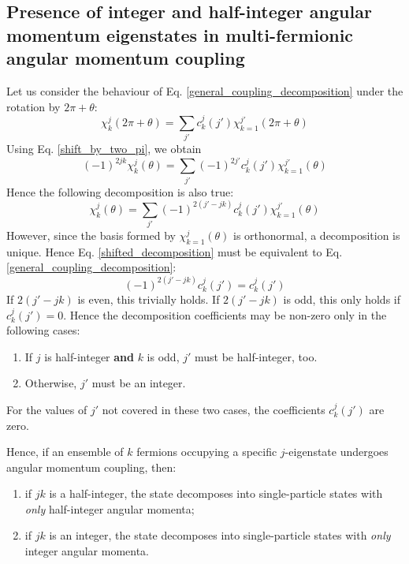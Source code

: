 \documentclass[12pt]{article}
\begin{document}
	\subsection{Presence of integer and half-integer angular momentum eigenstates in multi-fermionic angular momentum coupling} \label{presence_of_half_integer}
	Let us consider the behaviour of Eq. \ref{general_coupling_decomposition} under the rotation by $2\pi+\theta$:
	\begin{equation} 
	\chi^j_k(2\pi+\theta)=\sum_{j'}c^j_k(j')\chi^{j'}_{k=1}(2\pi+\theta)
	\end{equation}
	Using Eq. \ref{shift_by_two_pi}, we obtain
	\begin{equation} 
	(-1)^{2jk}\chi^j_k(\theta)=\sum_{j'}(-1)^{2j'}c^j_k(j')\chi^{j'}_{k=1}(\theta)
	\end{equation}
	Hence the following decomposition is also true:
	\begin{equation}  \label{shifted_decomposition}
	\chi^j_k(\theta)=\sum_{j'}(-1)^{2(j'-jk)}c^j_k(j')\chi^{j'}_{k=1}(\theta)
	\end{equation}
	However, since the basis formed by $\chi^j_{k=1}(\theta)$ is orthonormal, a decomposition is unique. Hence Eq. \ref{shifted_decomposition} must be equivalent to Eq. \ref{general_coupling_decomposition}:
	\begin{equation}
	(-1)^{2(j'-jk)}c^j_k(j') = c^j_k(j')
	\end{equation}
	If $2(j'-jk)$ is even, this trivially holds. If $2(j'-jk)$ is odd, this only holds if $c^j_k(j')=0$. Hence the decomposition coefficients may be non-zero only in the following cases:
	\begin{enumerate}
	\item If $j$ is half-integer \textbf{and} $k$ is odd, $j'$ must be half-integer, too.
	\item Otherwise, $j'$ must be an integer.
	\end{enumerate}
	For the values of $j'$ not covered in these two cases, the coefficients $c^j_k(j')$ are zero.
	
	Hence, if an ensemble of $k$ fermions occupying a specific $j$-eigenstate undergoes angular momentum coupling, then:
	\begin{enumerate}
	\item if $jk$ is a half-integer, the state decomposes into single-particle states with \textit{only} half-integer angular momenta;
	\item if $jk$ is an integer, the state decomposes into single-particle states with \textit{only} integer angular momenta.
	\end{enumerate}
	
\end{document}
